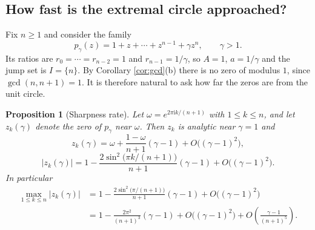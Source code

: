 \documentclass[11pt]{amsart}
\theoremstyle{plain}
\newtheorem{proposition}[theorem]{Proposition}
\theoremstyle{definition}
\theoremstyle{remark}
\newcommand{\ii}{\mathrm{i}}
\newcommand{\abs}[1]{\lvert #1\rvert}
\newcommand{\set}[1]{\{#1\}}
\begin{document}
\subsection{How fast is the extremal circle approached?}

Fix $n\ge1$ and consider the family
\begin{equation}\label{eq:gamma}
p_\gamma(z)=1+z+\cdots+z^{n-1}+\gamma z^{n},\qquad \gamma>1 .
\end{equation}
Its ratios are $r_0=\cdots=r_{n-2}=1$ and $r_{n-1}=1/\gamma$, so $A=1$, $a=1/\gamma$ and the
jump set is $I=\set n$. By Corollary \ref{cor:gcd}(b) there is no zero of modulus $1$,
since $\gcd(n,n+1)=1$. It is therefore natural to ask how far the zeros are from the unit
circle.

\begin{proposition}[Sharpness rate]\label{prop:gamma}
Let $\omega=e^{2\pi\ii k/(n+1)}$ with $1\le k\le n$, and let $z_k(\gamma)$ denote the zero
of $p_\gamma$ near $\omega$. Then $z_k$ is analytic near $\gamma=1$ and
\begin{equation}\label{eq:rate}
z_k(\gamma)=\omega+\frac{1-\omega}{n+1}(\gamma-1)+O\bigl((\gamma-1)^{2}\bigr),
\end{equation}
\begin{equation}\label{eq:rate2}
\abs{z_k(\gamma)}
=1-\frac{2\sin^{2}\bigl(\pi k/(n+1)\bigr)}{n+1}(\gamma-1)+O\bigl((\gamma-1)^{2}\bigr).
\end{equation}
In particular
\begin{align}
\max_{1\le k\le n}\abs{z_k(\gamma)}
&=1-\frac{2\sin^{2}\bigl(\pi/(n+1)\bigr)}{n+1}(\gamma-1)+O\bigl((\gamma-1)^{2}\bigr)\label{eq:rate3}\\
&=1-\frac{2\pi^{2}}{(n+1)^{3}}(\gamma-1)+O\bigl((\gamma-1)^{2}\bigr)
+O\!\left(\frac{\gamma-1}{(n+1)^{5}}\right).\label{eq:rate4}
\end{align}
\end{proposition}
\end{document}
